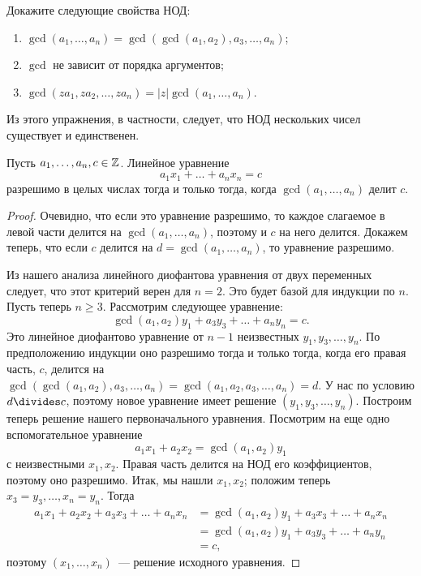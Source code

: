 \begin{exercise}
Докажите следующие свойства НОД:
\begin{enumerate}
\item $\gcd(a_1,\dots,a_n)=\gcd(\gcd(a_1,a_2),a_3,\dots,a_n)$;
\item $\gcd$ не зависит от порядка аргументов;
\item $\gcd(za_1,za_2,\dots,za_n)=|z|\gcd(a_1,\dots,a_n)$.
\end{enumerate}
\end{exercise}
Из этого упражнения, в частности, следует, что НОД нескольких чисел
существует и единственен.


\begin{theorem}
Пусть $a_1,\dots,a_n,c\in\mathbb Z$. Линейное уравнение
$$
a_1x_1+\dots+a_nx_n=c
$$
разрешимо в целых числах тогда и только тогда, когда
$\gcd(a_1,\dots,a_n)$ делит $c$.
\end{theorem}
\begin{proof}
Очевидно, что если это уравнение разрешимо, то каждое слагаемое в
левой части делится на $\gcd(a_1,\dots,a_n)$, поэтому и $c$ на него
делится. Докажем теперь, что если $c$ делится на
$d=\gcd(a_1,\dots,a_n)$, то уравнение разрешимо.

Из нашего анализа линейного диофантова уравнения от двух переменных
следует, что этот критерий верен для $n=2$. Это будет базой для
индукции по $n$. Пусть теперь $n\geq 3$.
Рассмотрим следующее уравнение:
$$
\gcd(a_1,a_2)y_1+a_3y_3+\dots+a_ny_n=c.
$$
Это линейное диофантово уравнение от $n-1$ неизвестных
$y_1,y_3,\dots,y_n$. По предположению индукции оно разрешимо тогда и
только тогда, когда его правая часть, $c$, делится на
$\gcd(\gcd(a_1,a_2),a_3,\dots,a_n)=\gcd(a_1,a_2,a_3,\dots,a_n)=d$. У
нас по условию $d\divides c$, поэтому новое уравнение имеет решение
$(y_1,y_3,\dots,y_n)$. Построим теперь решение нашего первоначального
уравнения. Посмотрим на еще одно вспомогательное уравнение
$$
a_1x_1+a_2x_2=\gcd(a_1,a_2)y_1
$$
с неизвестными $x_1,x_2$. Правая часть делится на НОД его
коэффициентов, поэтому оно разрешимо. Итак, мы нашли $x_1,x_2$;
положим теперь $x_3=y_3,\dots,x_n=y_n$. Тогда
\begin{align*}
a_1x_1+a_2x_2+a_3x_3+\dots+a_nx_n&=\gcd(a_1,a_2)y_1+a_3x_3+\dots+a_nx_n\\
&=\gcd(a_1,a_2)y_1+a_3y_3+\dots+a_ny_n\\
&=c,
\end{align*}
поэтому $(x_1,\dots,x_n)$~--- решение исходного уравнения.

\end{proof}

